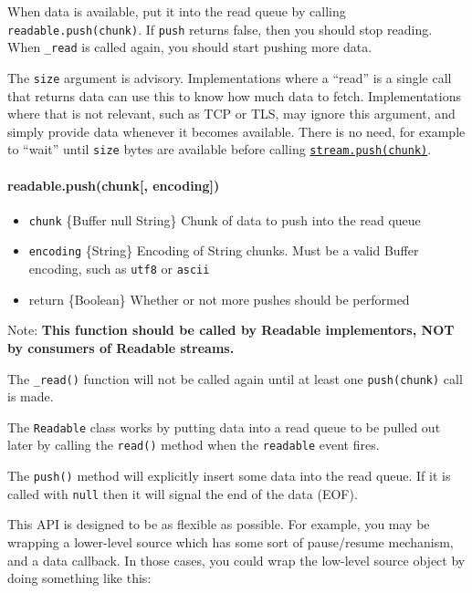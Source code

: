 When data is available, put it into the read queue by calling
\texttt{readable.push(chunk)}. If \texttt{push} returns false, then you
should stop reading. When \texttt{\_read} is called again, you should
start pushing more data.

The \texttt{size} argument is advisory. Implementations where a ``read''
is a single call that returns data can use this to know how much data to
fetch. Implementations where that is not relevant, such as TCP or TLS,
may ignore this argument, and simply provide data whenever it becomes
available. There is no need, for example to ``wait'' until \texttt{size}
bytes are available before calling
\hyperref[streamux5freadableux5fpushux5fchunkux5fencoding]{\texttt{stream.push(chunk)}}.

\paragraph{readable.push(chunk{[},
encoding{]})}\label{readable.pushchunk-encoding}

\begin{itemize}
\itemsep1pt\parskip0pt
\item
  \texttt{chunk} \{Buffer \textbar{} null \textbar{} String\} Chunk of
  data to push into the read queue
\item
  \texttt{encoding} \{String\} Encoding of String chunks. Must be a
  valid Buffer encoding, such as
  \texttt{\textquotesingle{}utf8\textquotesingle{}} or
  \texttt{\textquotesingle{}ascii\textquotesingle{}}
\item
  return \{Boolean\} Whether or not more pushes should be performed
\end{itemize}

Note: \textbf{This function should be called by Readable implementors,
NOT by consumers of Readable streams.}

The \texttt{\_read()} function will not be called again until at least
one \texttt{push(chunk)} call is made.

The \texttt{Readable} class works by putting data into a read queue to
be pulled out later by calling the \texttt{read()} method when the
\texttt{\textquotesingle{}readable\textquotesingle{}} event fires.

The \texttt{push()} method will explicitly insert some data into the
read queue. If it is called with \texttt{null} then it will signal the
end of the data (EOF).

This API is designed to be as flexible as possible. For example, you may
be wrapping a lower-level source which has some sort of pause/resume
mechanism, and a data callback. In those cases, you could wrap the
low-level source object by doing something like this:

